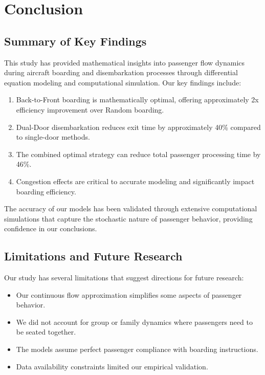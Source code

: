 \documentclass[12pt,a4paper]{article}
\begin{document}
\section{Conclusion}

\subsection{Summary of Key Findings}
This study has provided mathematical insights into passenger flow dynamics during aircraft boarding and disembarkation processes through differential equation modeling and computational simulation. Our key findings include:

\begin{enumerate}
    \item Back-to-Front boarding is mathematically optimal, offering approximately 2x efficiency improvement over Random boarding.
    \item Dual-Door disembarkation reduces exit time by approximately 40\% compared to single-door methods.
    \item The combined optimal strategy can reduce total passenger processing time by 46\%.
    \item Congestion effects are critical to accurate modeling and significantly impact boarding efficiency.
\end{enumerate}

The accuracy of our models has been validated through extensive computational simulations that capture the stochastic nature of passenger behavior, providing confidence in our conclusions.

\subsection{Limitations and Future Research}
Our study has several limitations that suggest directions for future research:
\begin{itemize}
    \item Our continuous flow approximation simplifies some aspects of passenger behavior.
    \item We did not account for group or family dynamics where passengers need to be seated together.
    \item The models assume perfect passenger compliance with boarding instructions.
    \item Data availability constraints limited our empirical validation.
\end{itemize}
\end{document}
